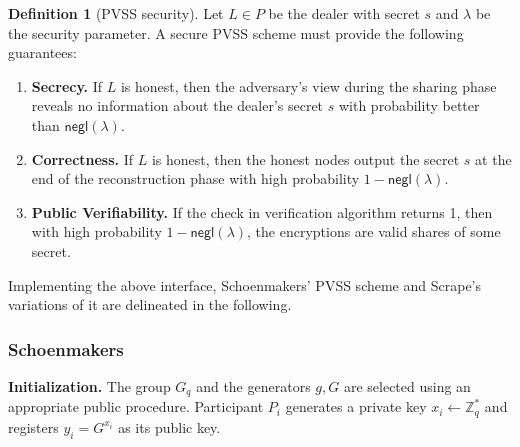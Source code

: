 \documentclass[letterpaper,twocolumn,10pt]{article}
\theoremstyle{definition}
\newtheorem{definition}[theorem]{Definition}
\theoremstyle{remark}
\begin{document}
\begin{definition}[PVSS security]
Let $L \in P$ be the dealer with secret $s$ and $\lambda$ be the security parameter. A secure PVSS scheme must provide the following guarantees:
\begin{enumerate}
\item \textbf{Secrecy.} If $L$ is honest, then the adversary's view during the sharing phase reveals no information about the dealer's secret $s$ with probability better than $\mathsf{negl}(\lambda)$.
\item \textbf{Correctness.} If $L$ is honest, then the honest nodes output the secret $s$ at the end of the reconstruction phase with high probability $1 - \mathsf{negl}(\lambda)$.
\item \textbf{Public Verifiability.} If the check in verification algorithm returns 1, then with high probability $1 - \mathsf{negl}(\lambda)$, the encryptions are valid shares of some secret.
\end{enumerate}
\end{definition}

Implementing the above interface, Schoenmakers' PVSS scheme and Scrape's variations of it are delineated in the following.

\subsubsection{Schoenmakers}
\textbf{Initialization.} The group $G_q$ and the generators $g, G$ are selected using an appropriate public procedure. Participant $P_i$ generates a private key $x_i \leftarrow \mathbb{Z}^*_q$ and registers $y_i = G^{x_i}$ as its public key.
\end{document}
